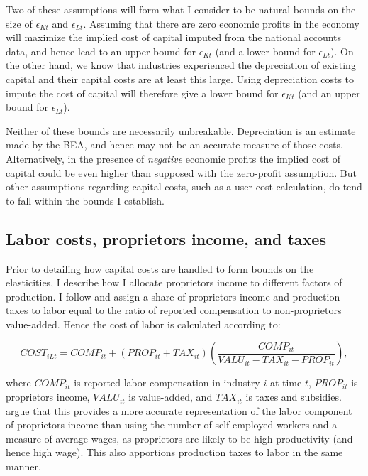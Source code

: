 \documentclass[11pt]{article}
\begin{document}
Two of these assumptions will form what I consider to be natural bounds on the size of $\epsilon_{Kt}$ and $\epsilon_{Lt}$. Assuming that there are zero economic profits in the economy will maximize the implied cost of capital imputed from the national accounts data, and hence lead to an upper bound for $\epsilon_{Kt}$ (and a lower bound for $\epsilon_{Lt}$). On the other hand, we know that industries experienced the depreciation of existing capital and their capital costs are at least this large. Using depreciation costs to impute the cost of capital will therefore give a lower bound for $\epsilon_{Kt}$ (and an upper bound for $\epsilon_{Lt}$). 

Neither of these bounds are necessarily unbreakable. Depreciation is an estimate made by the BEA, and hence may not be an accurate measure of those costs. Alternatively, in the presence of \textit{negative} economic profits the implied cost of capital could be even higher than supposed with the zero-profit assumption. But other assumptions regarding capital costs, such as a user cost calculation, do tend to fall within the bounds I establish.

\subsection{Labor costs, proprietors income, and taxes}
Prior to detailing how capital costs are handled to form bounds on the elasticities, I describe how I allocate proprietors income to different factors of production. I follow \cite{gommerupert2004} and assign a share of proprietors income and production taxes to labor equal to the ratio of reported compensation to non-proprietors value-added. Hence the cost of labor is calculated according to:

\begin{equation}
	COST_{iLt} = COMP_{it} + (PROP_{it} + TAX_{it})\left(\frac{COMP_{it}}{VALU_{it}-TAX_{it}-PROP_{it}}\right), \label{EQ_prop}
\end{equation}

where $COMP_{it}$ is reported labor compensation in industry $i$ at time $t$, $PROP_{it}$ is proprietors income, $VALU_{it}$ is value-added, and $TAX_{it}$ is taxes and subsidies. \cite{gommerupert2004} argue that this provides a more accurate representation of the labor component of proprietors income than using the number of self-employed workers and a measure of average wages, as proprietors are likely to be high productivity (and hence high wage). This also apportions production taxes to labor in the same manner.
\end{document}
